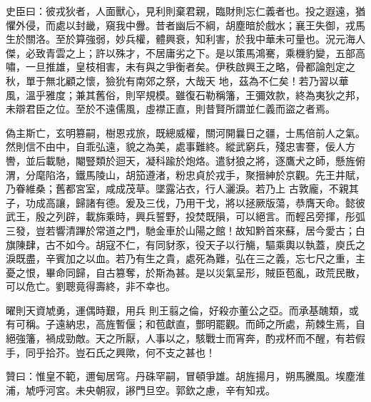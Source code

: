 \begin{pinyinscope}
 史臣曰：彼戎狄者，人面獸心，見利則棄君親，臨財則忘仁義者也。投之遐遠，猶懼外侵，而處以封畿，窺我中釁。昔者幽后不綱，胡塵暗於戲水；襄王失御，戎馬生於關洛。至於算強弱，妙兵權，體興衰，知利害，於我中華未可量也。況元海人傑，必致青雲之上；許以殊才，不居庸劣之下。是以策馬鴻騫，乘機豹變，五部高嘯，一旦推雄，皇枝相害，未有與之爭衡者矣。伊秩啟興王之略，骨都論剋定之秋，單于無北顧之懷，獫狁有南郊之祭，大哉天
 地，茲為不仁矣！若乃習以華風，溫乎雅度；兼其舊俗，則罕規模。雖復石勒稱籓，王彌效款，終為夷狄之邦，未辯君臣之位。至於不遠儒風，虛襟正直，則昔賢所謂並仁義而盜之者焉。



 偽主斯亡，玄明篡嗣，樹恩戎旅，既總威權，關河開曩日之疆，士馬倍前人之氣。然則信不由中，自乖弘遠，貌之為美，處事難終。縱武窮兵，殘忠害謇，佞人方轡，並后載馳，閹豎類於迴天，凝科踰於炮烙。遣豺狼之將，逐鷹犬之師，懸旌俯渭，分麾陷洛，鐵馬陵山，胡笳遵渚，粉忠貞於戎手，聚搢紳於京觀。先王井賦，乃眷維桑；舊都宮室，咸成茂草。墜露沾衣，行人灑淚。若乃上
 古敦龐，不親其子，功成高讓，歸諸有德。爰及三伐，乃用干戈，將以拯厥版蕩，恭膺天命。懿彼武王，殷之列辟，載旆乘時，興兵誓野，投焚既隕，可以絕言。而輕呂旁揮，彤弧三發，豈若響清蹕於常道之門，馳金車於山陽之館！故知黔首來蘇，居今愛古；白旗陳肆，古不如今。胡寇不仁，有同豺豕，役天子以行觴，驅乘輿以執蓋，庾氏之淚既盡，辛賓加之以血。若乃有生之貴，處死為難，弘在三之義，忘七尺之重，主憂之恨，畢命同歸，自古篡奪，於斯為甚。是以災氣呈形，賊臣苞亂，政荒民散，可以危亡。劉聰竟得壽終，非不幸也。



 曜則天資虓勇，運偶時艱，用兵
 則王翦之倫，好殺亦董公之亞。而承基醜類，或有可稱。子遠納忠，高旌暫偃；和苞獻直，酆明罷觀。而師之所處，荊棘生焉，自絕強籓，禍成勁敵。天之所厭，人事以之，駭戰士而宵奔，酌戎杯而不醒，有若假手，同乎拾芥。豈石氏之興歟，何不支之甚也！



 贊曰：惟皇不範，邇甸居穹。丹硃罕嗣，冒頓爭雄。胡旌揚月，朔馬騰風。埃塵淮浦，虓呼河宮。未央朝寂，謻門旦空。郭欽之慮，辛有知戎。



\end{pinyinscope}
